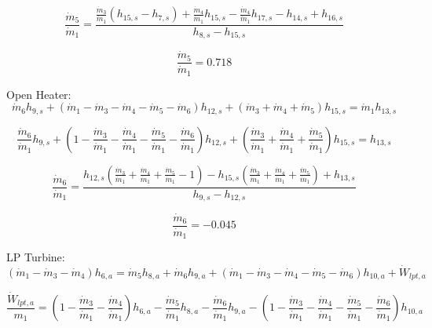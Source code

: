 \documentclass{article}
\begin{document}
\begin{equation}
\frac{\dot{m}_{5}}{\dot{m}_{1}} = \frac{\frac{\dot{m}_{3}}{\dot{m}_{1}}(h_{15,s} - h_{7,s}) + \frac{\dot{m}_{4}}{\dot{m}_{1}}h_{15,s} - \frac{\dot{m}_{4}}{\dot{m}_{1}}h_{17,s} - h_{14,s} + h_{16,s}}{h_{8,s} - h_{15,s}}
\end{equation}

\begin{equation}
\frac{\dot{m}_{5}}{\dot{m}_{1}} =    0.718
\end{equation}


Open Heater:
\begin{equation}
\dot{m}_{ 6}h_{ 9,s} + (\dot{m}_{ 1} - \dot{m}_{ 3} - \dot{m}_{ 4} - \dot{m}_{ 5} - \dot{m}_{ 6})h_{12,s} + (\dot{m}_{ 3} + \dot{m}_{ 4} + \dot{m}_{ 5})h_{15,s} = \dot{m}_{ 1}h_{13,s}
\end{equation}

\begin{equation}
\frac{\dot{m}_{ 6}}{\dot{m}_{ 1}}h_{ 9,s} + (1 - \frac{\dot{m}_{ 3}}{\dot{m}_{ 1}} - \frac{\dot{m}_{ 4}}{\dot{m}_{ 1}} - \frac{\dot{m}_{ 5}}{\dot{m}_{ 1}} - \frac{\dot{m}_{ 6}}{\dot{m}_{ 1}})h_{12,s} + (\frac{\dot{m}_{ 3}}{\dot{m}_{ 1}} + \frac{\dot{m}_{ 4}}{\dot{m}_{ 1}} + \frac{\dot{m}_{ 5}}{\dot{m}_{ 1}})h_{15,s} = h_{13,s}
\end{equation}

\begin{equation}
\frac{\dot{m}_{ 6}}{\dot{m}_{ 1}} = \frac{h_{12,s}(\frac{\dot{m}_{3}}{\dot{m}_{1}} + \frac{\dot{m}_{4}}{\dot{m}_{1}} + \frac{\dot{m}_{5}}{\dot{m}_{1}} - 1) - h_{15,s}(\frac{\dot{m}_{3}}{\dot{m}_{1}} + \frac{\dot{m}_{4}}{\dot{m}_{1}} + \frac{\dot{m}_{5}}{\dot{m}_{1}}) + h_{13,s}}{h_{9,s} - h_{12,s}}
\end{equation}

\begin{equation}
\frac{\dot{m}_{ 6}}{\dot{m}_{ 1}} =   -0.045
\end{equation}


LP Turbine:
\begin{equation}
(\dot{m}_{ 1} - \dot{m}_{ 3} - \dot{m}_{ 4})h_{ 6,a} = \dot{m}_{ 5}h_{ 8,a} + \dot{m}_{ 6}h_{ 9,a} + (\dot{m}_{ 1} - \dot{m}_{ 3} - \dot{m}_{ 4} - \dot{m}_{ 5} - \dot{m}_{ 6})h_{10,a} + \dot{W}_{lpt,a}
\end{equation}

\begin{equation}
\frac{\dot{W}_{lpt,a}}{m_1} = (1 - \frac{\dot{m}_{ 3}}{\dot{m}_{ 1}} - \frac{\dot{m}_{ 4}}{\dot{m}_{ 1}})h_{ 6,a} - \frac{\dot{m}_{ 5}}{\dot{m}_{ 1}}h_{ 8,a} - \frac{\dot{m}_{ 6}}{\dot{m}_{ 1}}h_{ 9,a} - (1 - \frac{\dot{m}_{ 3}}{\dot{m}_{ 1}} - \frac{\dot{m}_{ 4}}{\dot{m}_{ 1}} - \frac{\dot{m}_{ 5}}{\dot{m}_{ 1}} - \frac{\dot{m}_{ 6}}{\dot{m}_{ 1}})h_{10,a}\end{equation}
\end{document}
